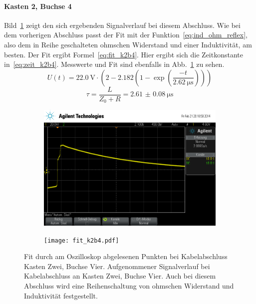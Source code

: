 \paragraph{Kasten 2, Buchse 4}
Bild~\ref{fig:k2b4} zeigt den sich ergebenden Signalverlauf bei diesem
Abschluss.  Wie bei dem vorherigen Abschluss passt der Fit mit der
Funktion~\eqref{eq:ind_ohm_reflex}, also dem in Reihe geschalteten
ohmschen Widerstand und einer Induktivität, am besten.  Der Fit ergibt
Formel~\eqref{eq:fit_k2b4}.  Hier ergibt sich die Zeitkonstante
in~\eqref{eq:zeit_k2b4}.  Messwerte und Fit sind ebenfalls in
Abb.~\ref{fig:k2b4} zu sehen.
%
\begin{equation}
  U(t) = \SI{22.0}{\volt}\cdot\left(2 - 
    2.182\left(1-\exp{\left(\frac{-t}{\SI{2.62}{\micro\second}}\right)}
    \right)\right)
  \label{eq:fit_k2b4}
\end{equation}
%
\begin{equation}
  \tau = \frac{L}{Z_0 + R} = \SI{2.61(8)}{\micro\second}
  \label{eq:zeit_k2b4}
\end{equation}
%
\begin{figure}[]
  \centering

  \begin{subfigure}{0.45\textwidth}
    \includegraphics[width=\textwidth]{k2b4.png}
  \end{subfigure}
  \quad
  \begin{subfigure}{0.45\textwidth}
    \texttt{[image: fit\_k2b4.pdf]}
  \end{subfigure}

  \caption{Fit durch am Oszilloskop abgelesenen Punkten bei
    Kabelabschluss Kasten Zwei, Buchse Vier.  Aufgenommener
    Signalverlauf bei Kabelabschluss an Kasten Zwei, Buchse Vier. Auch
    bei diesem Abschluss wird eine Reihenschaltung von ohmschen
    Widerstand und Induktivität festgestellt.}
  \label{fig:k2b4}
\end{figure}

